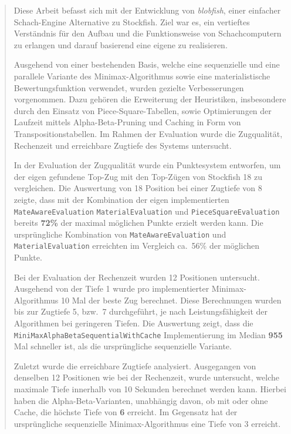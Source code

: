 
\begin{abstract}
    Diese Arbeit befasst sich mit der Entwicklung von \textit{blobfish}, einer einfacher Schach-Engine Alternative zu Stockfish.
    Ziel war es, ein vertieftes Verständnis für den Aufbau und die Funktionsweise von Schachcomputern zu erlangen und darauf basierend eine eigene zu realisieren.

    Ausgehend von einer bestehenden Basis, welche eine sequenzielle und eine parallele Variante des Minimax-Algorithmus sowie eine materialistische Bewertungsfunktion verwendet, wurden gezielte Verbesserungen vorgenommen.
    Dazu gehören die Erweiterung der Heuristiken, insbesondere durch den Einsatz von Piece-Square-Tabellen, sowie Optimierungen der Laufzeit mittels Alpha-Beta-Pruning und Caching in Form von Transpositionstabellen.
    Im Rahmen der Evaluation wurde die Zugqualität, Rechenzeit und erreichbare Zugtiefe des Systems untersucht.

    In der Evaluation der Zugqualität wurde ein Punktesystem entworfen, um der eigen gefundene Top-Zug mit den Top-Zügen von Stockfish 18 zu vergleichen.
    Die Auswertung von 18 Position bei einer Zugtiefe von 8 zeigte, dass mit der Kombination der eigen implementierten \texttt{MateAwareEvaluation} \texttt{MaterialEvaluation} und \texttt{PieceSquareEvaluation} bereits \textbf{72\%} der maximal möglichen Punkte erzielt werden kann.
    Die ursprüngliche Kombination von \texttt{MateAwareEvaluation} und \texttt{MaterialEvaluation} erreichten im Vergleich ca.\ 56\% der möglichen Punkte.

    Bei der Evaluation der Rechenzeit wurden 12 Positionen untersucht.
    Ausgehend von der Tiefe 1 wurde pro implementierter Minimax-Algorithmus 10 Mal der beste Zug berechnet.
    Diese Berechnungen wurden bis zur Zugtiefe 5, bzw.\ 7 durchgeführt, je nach Leistungsfähigkeit der Algorithmen bei geringeren Tiefen.
    Die Auswertung zeigt, dass die \texttt{MiniMaxAlphaBetaSequentialWithCache} Implementierung im Median \textbf{955} Mal schneller ist, als die ursprüngliche sequenzielle Variante.

    Zuletzt wurde die erreichbare Zugtiefe analysiert.
    Ausgegangen von denselben 12 Positionen wie bei der Rechenzeit, wurde untersucht, welche maximale Tiefe innerhalb von 10 Sekunden berechnet werden kann.
    Hierbei haben die Alpha-Beta-Varianten, unabhängig davon, ob mit oder ohne Cache, die höchste Tiefe von \textbf{6} erreicht.
    Im Gegensatz hat der ursprüngliche sequenzielle Minimax-Algorithmus eine Tiefe von 3 erreicht.


\end{abstract}
